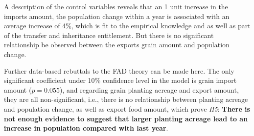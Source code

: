 A description of the control variables reveals that an 1 unit increase in the imports amount, the population change within a year is associated with an average increase of 4\%, which is fit to the empirical knowledge and as well as part of the transfer and inheritance entitlement. But there is no significant relationship be observed between the exports grain amount and population change.

Further data-based rebuttals to the FAD theory can be made here. The only significant coefficient under 10\% confidence level in the model is grain import amount ($p=0.055$), and regarding grain planting acreage and export amount, they are all non-significant, i.e., there is no relationship between planting acreage and population change, as well as export food amount, which prove \textit{H5}: \textbf{There is not enough evidence to suggest that larger planting acreage lead to an increase in population compared with last year}. 


